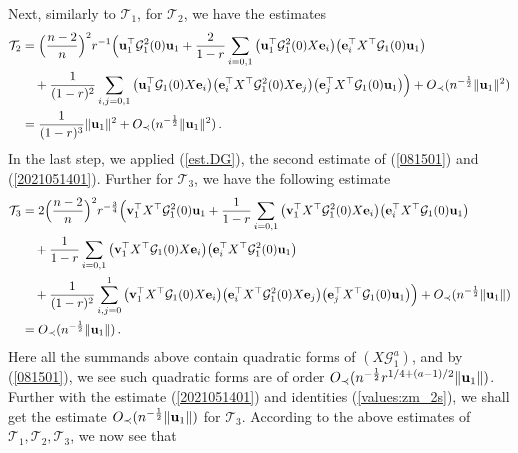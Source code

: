 \documentclass[12pt]{article}
\numberwithin{equation}{section}
\theoremstyle{remark}
\newcommand{\1}{{\rm 1}\kern-0.24em{\rm I}}
\begin{document}
\begin{appendices}
Next, similarly to $\mathcal{T}_1$, for $\mathcal{T}_2$, we have the estimates 
\begin{align*}
\mathcal{T}_2&= \Big(\frac{n-2}{n}\Big)^2 r^{-1} \Big( {\bf u}_1^{\top}  \mathcal{G}_1^2(0){\bf u}_1 + \frac {2}{1-r}\sum_{i=0,1} \big({\bf u}_1^{\top}  \mathcal{G}_1^2(0){X}{\bf e}_i \big)\big({\bf e}_i^{\top} {X}^{\top} \mathcal{G}_1(0){\bf u}_1\big) \notag\\
&\quad + \frac{1}{(1-r)^2} \sum_{i,j=0,1} \big({\bf u}_1^{\top} \mathcal{G}_1(0){X}{\bf e}_i \big) \big({\bf e}_i^{\top} {X}^{\top} \mathcal{G}_1^2(0){X}{\bf e}_j\big)
\big({\bf e}_j^{\top} {X}^{\top} \mathcal{G}_1(0){\bf u}_1\big)\Big) + O_\prec(n^{-\frac 12}\Vert {\bf u}_1\Vert^2) \notag\\
& =  \frac{1}{(1-r)^3} \Vert {\bf u}_1\Vert^2 +  O_\prec(n^{-\frac 12}\Vert {\bf u}_1\Vert^2 )\,.
\end{align*}
In the last step, we applied (\ref{est.DG}), the second estimate of (\ref{081501}) and (\ref{2021051401}).
Further for $\mathcal{T}_3$, we have the following estimate 
\begin{align*}
\mathcal{T}_3 &=2\Big(\frac{n-2}{n}\Big)^2 r^{-\frac 34} \Big( {\bf v}_1^{\top} {X}^{\top}  \mathcal{G}_1^2(0){\bf u}_1 + \frac {1}{1-r}\sum_{i=0,1} \big({\bf v}_1^{\top} {X}^{\top}  \mathcal{G}_1^2(0){X}{\bf e}_i \big)\big({\bf e}_i^{\top} {X}^{\top} \mathcal{G}_1(0){\bf u}_1\big)  \notag\\
&\quad 
+  \frac {1}{1-r}\sum_{i=0,1}\big({\bf v}_1^{\top} {X}^{\top}  \mathcal{G}_1(0){X}{\bf e}_i \big)\big({\bf e}_i^{\top} {X}^{\top} \mathcal{G}_1^2(0){\bf u}_1\big)  \notag\\
&\quad + \frac{1}{(1-r)^2} \sum_{i,j=0}^1 \big({\bf v}_1^{\top} {X}^{\top} \mathcal{G}_1(0){X}{\bf e}_i \big) \big({\bf e}_i^{\top} {X}^{\top} \mathcal{G}_1^2(0){X}{\bf e}_j\big)
\big({\bf e}_j^{\top} {X}^{\top} \mathcal{G}_1(0){\bf u}_1\big)\Big) + O_\prec(n^{-\frac 12}\Vert {\bf u}_1 \Vert) \notag\\
&=  O_\prec(n^{-\frac 12}\Vert {\bf u}_1 \Vert)\,. 
\end{align*}
Here all the summands above contain  quadratic forms of $({X}\mathcal{G}_1^{a})$, and by (\ref{081501}), we see such quadratic forms are of order $O_\prec(n^{-\frac12}r^{1/4+(a-1)/2}\Vert {\bf u}_1 \Vert)$. Further with  the estimate (\ref{2021051401}) and identities (\ref{values:zm_2s}), we shall get the estimate $O_\prec(n^{-\frac 12}\Vert {\bf u}_1 \Vert) $ for $\mathcal{T}_3$.
According to the above estimates of $\mathcal{T}_1, \mathcal{T}_2, \mathcal{T}_3 $, we now  see that 

\end{appendices}
\end{document}

